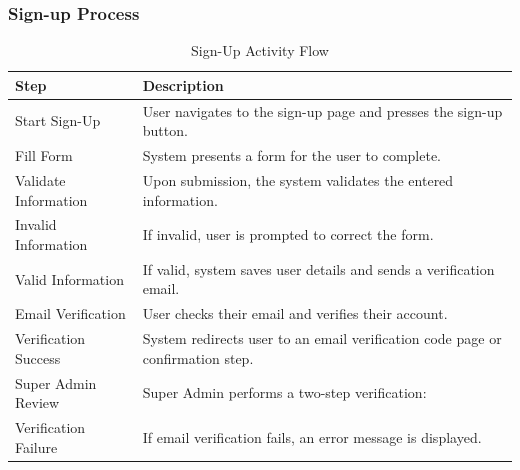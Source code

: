 \subsubsection{Sign-up Process}


\begin{table}[htbp]
    \centering
    \begin{tabular}{|p{4cm}|p{9cm}|}
        \hline
        \textbf{Step} & \textbf{Description} \\
        \hline
        Start Sign-Up & User navigates to the sign-up page and presses the sign-up button. \\
        \hline
        Fill Form & System presents a form for the user to complete. \\
        \hline
        Validate Information & Upon submission, the system validates the entered information. \\
        \hline
        Invalid Information & If invalid, user is prompted to correct the form. \\
        \hline
        Valid Information & If valid, system saves user details and sends a verification email. \\
        \hline
        Email Verification & User checks their email and verifies their account. \\
        \hline
        Verification Success & System redirects user to an email verification code page or confirmation step. \\
        \hline
        Super Admin Review & Super Admin performs a two-step verification: \\
        \hline
        Verification Failure & If email verification fails, an error message is displayed. \\
        \hline
    \end{tabular}
    \caption{Sign-Up Activity Flow}
    \label{tab:signup-activity-flow}
\end{table}






